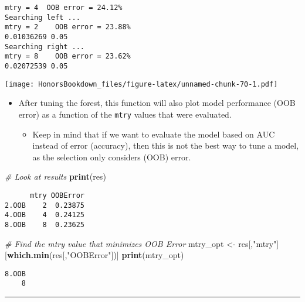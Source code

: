\documentclass[
]{book}
\newenvironment{Shaded}{\begin{snugshade}}{\end{snugshade}}
\newcommand{\CommentTok}[1]{\textcolor[rgb]{0.56,0.35,0.01}{\textit{#1}}}
\newcommand{\KeywordTok}[1]{\textcolor[rgb]{0.13,0.29,0.53}{\textbf{#1}}}
\newcommand{\NormalTok}[1]{#1}
\newcommand{\StringTok}[1]{\textcolor[rgb]{0.31,0.60,0.02}{#1}}
\providecommand{\tightlist}{%
  \setlength{\itemsep}{0pt}\setlength{\parskip}{0pt}}
\begin{document}
\begin{verbatim}
mtry = 4  OOB error = 24.12% 
Searching left ...
mtry = 2    OOB error = 23.88% 
0.01036269 0.05 
Searching right ...
mtry = 8    OOB error = 23.62% 
0.02072539 0.05 
\end{verbatim}

\texttt{[image: HonorsBookdown\_files/figure-latex/unnamed-chunk-70-1.pdf]}

\begin{itemize}
\tightlist
\item
  After tuning the forest, this function will also plot model performance (OOB error) as a function of the \texttt{mtry} values that were evaluated.

  \begin{itemize}
  \tightlist
  \item
    Keep in mind that if we want to evaluate the model based on AUC instead of error (accuracy), then this is not the best way to tune a model, as the selection only considers (OOB) error.
  \end{itemize}
\end{itemize}

\begin{Shaded}
\begin{Highlighting}[]
\CommentTok{# Look at results}
\KeywordTok{print}\NormalTok{(res)}
\end{Highlighting}
\end{Shaded}

\begin{verbatim}
      mtry OOBError
2.OOB    2  0.23875
4.OOB    4  0.24125
8.OOB    8  0.23625
\end{verbatim}

\begin{Shaded}
\begin{Highlighting}[]
\CommentTok{# Find the mtry value that minimizes OOB Error}
\NormalTok{mtry_opt <-}\StringTok{ }\NormalTok{res[,}\StringTok{"mtry"}\NormalTok{][}\KeywordTok{which.min}\NormalTok{(res[,}\StringTok{"OOBError"}\NormalTok{])]}
\KeywordTok{print}\NormalTok{(mtry_opt)}
\end{Highlighting}
\end{Shaded}

\begin{verbatim}
8.OOB 
    8 
\end{verbatim}

\begin{center}\rule{0.5\linewidth}{0.5pt}\end{center}
\end{document}
